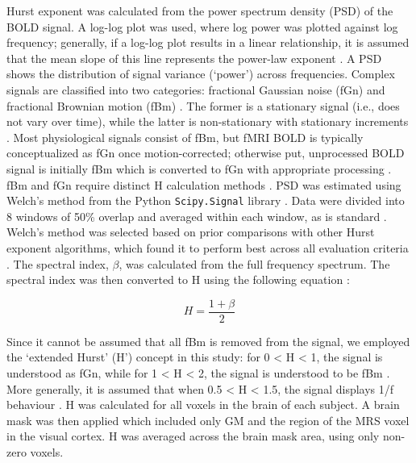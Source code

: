 \documentclass[
true
]{sn-jnl}
\begin{document}
Hurst exponent was calculated from the power spectrum density (PSD) of
the BOLD signal. A log-log plot was used, where log power was plotted
against log frequency; generally, if a log-log plot results in a linear
relationship, it is assumed that the mean slope of this line represents
the power-law exponent \citep{zimmernWhyBrainCriticality2020}. A PSD
shows the distribution of signal variance (`power') across frequencies.
Complex signals are classified into two categories: fractional Gaussian
noise (fGn) and fractional Brownian motion (fBm)
\citep{duffPowerSpectralDensity2008, ekeFractalCharacterizationComplexity2002}.
The former is a stationary signal (i.e., does not vary over time), while
the latter is non-stationary with stationary increments
\citep{ekeFractalCharacterizationComplexity2002}. Most physiological
signals consist of fBm, but fMRI BOLD is typically conceptualized as fGn
once motion-corrected; otherwise put, unprocessed BOLD signal is
initially fBm which is converted to fGn with appropriate processing
\citep{bullmoreWaveletsFunctionalMagnetic2004}. fBm and fGn require
distinct H calculation methods
\citep{ekeFractalCharacterizationComplexity2002}. PSD was estimated
using Welch's method \citep{welchUseFastFourier1967} from the Python
\texttt{Scipy.Signal} library \citep{virtanenSciPy10Fundamental2020}.
Data were divided into 8 windows of 50\% overlap and averaged within
each window, as is standard
\citep{rubinOptimizingComplexityMeasures2013}. Welch's method was
selected based on prior comparisons with other Hurst exponent
algorithms, which found it to perform best across all evaluation
criteria \citep{rubinOptimizingComplexityMeasures2013}. The spectral
index, \(\beta\), was calculated from the full frequency spectrum. The
spectral index was then converted to H using the following equation
\citep{ekeFractalCharacterizationComplexity2002, schaeferComparativeAnalysisSpectral2014}:

\[
H = \frac{1 + \beta}{2}
\]

Since it cannot be assumed that all fBm is removed from the signal, we
employed the `extended Hurst' (H') concept in this study: for 0
\textless{} H \textless{} 1, the signal is understood as fGn, while for
1 \textless{} H \textless{} 2, the signal is understood to be fBm
\citep{campbellFractalBasedAnalysisFMRI2022, hartmannRealtimeFractalSignal2013, ekePhysiologicalTimeSeries2000}.
More generally, it is assumed that when 0.5 \textless{} H \textless{}
1.5, the signal displays 1/f behaviour
\citep{zimmernWhyBrainCriticality2020}. H was calculated for all voxels
in the brain of each subject. A brain mask was then applied which
included only GM and the region of the MRS voxel in the visual cortex. H
was averaged across the brain mask area, using only non-zero voxels.
\end{document}
